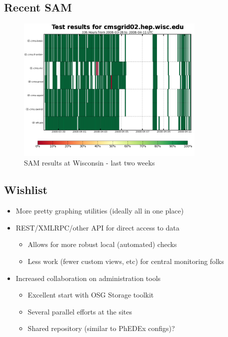 \documentclass{beamer}
\begin{document}
\subsection{Recent SAM}
\begin{frame}
\begin{figure}
    \includegraphics[height=7cm]{Graphics/sam.png}
    \caption{SAM results at Wisconsin - last two weeks}
\end{figure}
\end{frame}

\subsection{Wishlist}
\begin{frame}
\begin{itemize}
    \item More pretty graphing utilities (ideally all in one place)
    \item REST/XMLRPC/other API for direct access to data
    \begin{itemize}
        \item Allows for more robust local (automated) checks
        \item Less work (fewer custom views, etc) for central monitoring folks
    \end{itemize}
    \item Increased collaboration on administration tools
    \begin{itemize}
        \item Excellent start with OSG Storage toolkit
        \item Several parallel efforts at the sites
        \item Shared repository (similar to PhEDEx configs)?
    \end{itemize}
\end{itemize}
\end{frame}
\end{document}
